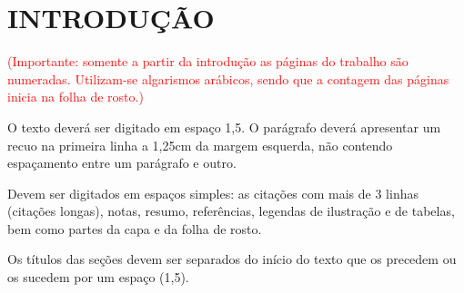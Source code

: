 
\chapter{INTRODUÇÃO}

  \textcolor{red}{(Importante: somente a partir da introdução as páginas do trabalho são numeradas. Utilizam-se algarismos arábicos, sendo que a contagem das páginas inicia na folha de rosto.)}

  O texto deverá ser digitado em espaço 1,5. O parágrafo deverá apresentar um recuo na primeira linha a 1,25cm da margem esquerda, não contendo espaçamento entre um parágrafo e outro.

  Devem ser digitados em espaços simples: as citações com mais de 3 linhas (citações longas), notas, resumo, referências, legendas de ilustração e de tabelas, bem como partes da capa e da folha de rosto.

  Os títulos das seções devem ser separados do início do texto que os precedem ou os sucedem por um espaço (1,5).

  \bigskip
